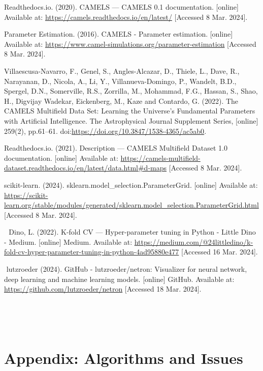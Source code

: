 \documentclass[11pt]{scrartcl}
\begin{document}
\newpage
\begin{thebibliography}{9}


Readthedocs.io. (2020). CAMELS — CAMELS 0.1 documentation. [online] Available at: \url{https://camels.readthedocs.io/en/latest/} [Accessed 8 Mar. 2024].

Parameter Estimation. (2016). CAMELS - Parameter estimation. [online] Available at: \url{https://www.camel-simulations.org/parameter-estimation} [Accessed 8 Mar. 2024].

Villaescusa-Navarro, F., Genel, S., Angles-Alcazar, D., Thiele, L., Dave, R., Narayanan, D., Nicola, A., Li, Y., Villanueva-Domingo, P., Wandelt, B.D., Spergel, D.N., Somerville, R.S., Zorrilla, M., Mohammad, F.G., Hassan, S., Shao, H., Digvijay Wadekar, Eickenberg, M., Kaze and Contardo, G. (2022). The CAMELS Multifield Data Set: Learning the Universe’s Fundamental Parameters with Artificial Intelligence. The Astrophysical Journal Supplement Series, [online] 259(2), pp.61–61. doi:\url{https://doi.org/10.3847/1538-4365/ac5ab0}.



Readthedocs.io. (2021). Description — CAMELS Multifield Dataset 1.0 documentation. [online] Available at: \url{https://camels-multifield-dataset.readthedocs.io/en/latest/data.html\#d-maps} [Accessed 8 Mar. 2024].

scikit-learn. (2024). sklearn.model\_selection.ParameterGrid. [online] Available at: \url{https://scikit-learn.org/stable/modules/generated/sklearn.model\_selection.ParameterGrid.html} [Accessed 8 Mar. 2024].

‌
‌
Dino, L. (2022). K-fold CV — Hyper-parameter tuning in Python - Little Dino - Medium. [online] Medium. Available at: \url{https://medium.com/@24littledino/k-fold-cv-hyper-parameter-tuning-in-python-4ad95880e477} [Accessed 16 Mar. 2024].

‌
lutzroeder (2024). GitHub - lutzroeder/netron: Visualizer for neural network, deep learning and machine learning models. [online] GitHub. Available at: \url{https://github.com/lutzroeder/netron} [Accessed 18 Mar. 2024].

‌


\end{thebibliography}
‌
\newpage
\appendix

\section{Appendix: Algorithms and Issues}
\label{Early-Stop}
\end{document}
